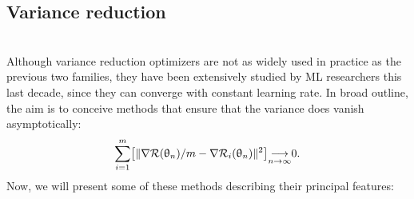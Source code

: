 \documentclass[article,authoryear,jmlmc]{beg_32}             %
\begin{document}
\subsection{Variance reduction}  
~~\\
Although variance reduction optimizers are not as widely used in practice as the previous two families, they have been extensively studied by ML researchers this last decade, since they can converge with constant learning
rate. In broad outline, the aim is to conceive methods that ensure that the variance does vanish asymptotically:
\begin{equation*}
  \displaystyle{\sum_{i=1}^m}\left[\|\nR(\theta_n)/m-\nR_i(\theta_n)\|^2\right] {\underset{n\to \infty}{\longrightarrow}} 0.
\end{equation*}
Now, we will present some of these methods describing their principal features:
\end{document}
